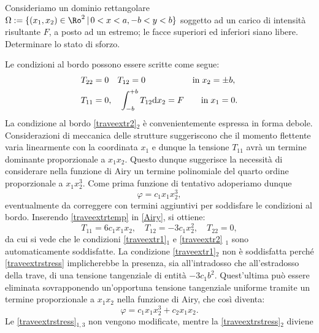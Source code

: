 \begin{exercise}
Consideriamo un dominio rettangolare $\Omega:=\{(x_1,x_2)\in \Ro^2 \,|\,0<x<a,-b<y<b  \}$ soggetto ad un carico di intensità risultante $F$, a posto ad un estremo; le facce superiori ed inferiori siano libere. Determinare lo stato di sforzo.

\begin{svolgimento}
	

Le condizioni al bordo possono essere scritte come segue:
\begin{align}
	& T_{22}=0 \quad T_{12}=0 \quad &&{\rm in}\; x_2=\pm b, \label{traveextr1} \\
	& T_{11}=0, \quad \int_{-b}^{+b}T_{12}{\rm d}x_2=F &&\quad {\rm in}\; x_1=0.\label{traveextr2}
\end{align}
La condizione al bordo \eqref{traveextr2}$_2$ è convenientemente espressa in forma debole. Considerazioni di meccanica delle strutture suggeriscono che il momento flettente varia linearmente con la coordinata $x_1$ e dunque la tensione $T_{11}$ avrà un termine dominante proporzionale a $x_1x_2$. Questo dunque suggerisce la necessità di considerare nella funzione di Airy un termine polinomiale del quarto ordine proporzionale a $x_1x_2^3$. Come prima funzione di tentativo adoperiamo dunque 
\begin{equation}\label{traveextrtemp}
	\varphi=c_1x_1x_2^3,
\end{equation}
eventualmente da correggere con termini aggiuntivi per soddisfare le condizioni al bordo. Inserendo \eqref{traveextrtemp} in \eqref{Airy}, si ottiene:
\begin{equation}\label{traveextrstress}
	T_{11}= 6c_1x_1x_2, \quad T_{12}=-3c_1x_2^2, \quad T_{22}=0,
\end{equation}
da cui si vede che le condizioni \eqref{traveextr1}$_1$ e \eqref{traveextr2} $_1$ sono automaticamente soddisfatte. La condizione \eqref{traveextr1}$_2$ non è soddisfatta perché \eqref{traveextrstress} implicherebbe la presenza, sia all'intradosso che all'estradosso della trave, di una tensione tangenziale di entità $-3c_1b^2$. Quest'ultima può essere eliminata sovrapponendo un'opportuna tensione tangenziale uniforme tramite un termine proporzionale a $x_1x_2$ nella funzione di Airy, che così diventa:
\begin{equation}
	\varphi=c_1x_1x_2^3+c_2x_1x_2.
\end{equation}
Le \eqref{traveextrstress}$_{1,3}$ non vengono modificate, mentre la \eqref{traveextrstress}$_{2}$ diviene
\begin{equation}

\end{equation}
\end{svolgimento}
\end{exercise}
